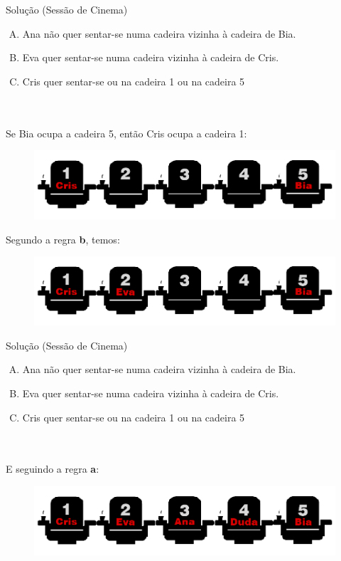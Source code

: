 \documentclass{beamer}
\begin{document}
\begin{frame}{Solução (Sessão de Cinema)}
\begin{enumerate}[(A)]
  \item Ana não quer sentar-se numa cadeira vizinha à cadeira de Bia.
    \item Eva quer sentar-se numa cadeira vizinha à cadeira de Cris.
    \item Cris quer sentar-se ou na cadeira 1 ou na cadeira 5
 \end{enumerate}
 \\
 \\
Se Bia ocupa a cadeira 5, então Cris ocupa a cadeira 1:
 \begin{figure}[ht]
        \centering
        \includegraphics[width=.8\textwidth]{nomes7.png}
        \label{fig:exampleFig2}
        \end{figure}
Segundo a regra \textbf{b}, temos: 
 \begin{figure}[ht]
        \centering
        \includegraphics[width=.8\textwidth]{nomes8.png}
        \label{fig:exampleFig2}
        \end{figure}
\end{frame}
\begin{frame}{Solução (Sessão de Cinema)}
\begin{enumerate}[(A)]
  \item Ana não quer sentar-se numa cadeira vizinha à cadeira de Bia.
    \item Eva quer sentar-se numa cadeira vizinha à cadeira de Cris.
    \item Cris quer sentar-se ou na cadeira 1 ou na cadeira 5
 \end{enumerate}
 \\
 \\

E seguindo a regra \textbf{a}:
        \begin{figure}[ht]
        \centering
        \includegraphics[width=.8\textwidth]{nomes9.png}
        \label{fig:exampleFig2}
        \end{figure}
\end{frame}
\end{document}
